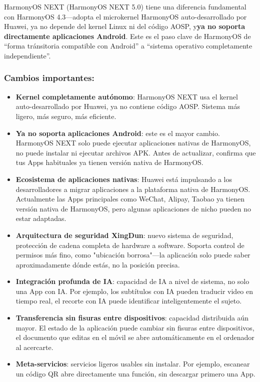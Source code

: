 
HarmonyOS NEXT (HarmonyOS NEXT 5.0) tiene una diferencia fundamental con HarmonyOS 4.3—adopta el microkernel HarmonyOS auto-desarrollado por Huawei, ya no depende del kernel Linux ni del código AOSP, y\textbf{ya no soporta directamente aplicaciones Android}. Este es el paso clave de HarmonyOS de “forma tránsitoria compatible con Android” a “sistema operativo completamente independiente”.

\subsubsection*{Cambios importantes:}

\begin{itemize}
  \item \textbf{Kernel completamente autónomo}: HarmonyOS NEXT usa el kernel auto-desarrollado por Huawei, ya no contiene código AOSP. Sistema más ligero, más seguro, más eficiente.
  \item \textbf{Ya no soporta aplicaciones Android}: este es el mayor cambio. HarmonyOS NEXT solo puede ejecutar aplicaciones nativas de HarmonyOS, no puede instalar ni ejecutar archivos APK. Antes de actualizar, confirma que tus Apps habituales ya tienen versión nativa de HarmonyOS.
  \item \textbf{Ecosistema de aplicaciones nativas}: Huawei está impulsando a los desarrolladores a migrar aplicaciones a la plataforma nativa de HarmonyOS. Actualmente las Apps principales como WeChat, Alipay, Taobao ya tienen versión nativa de HarmonyOS, pero algunas aplicaciones de nicho pueden no estar adaptadas.
  \item \textbf{Arquitectura de seguridad XingDun}: nuevo sistema de seguridad, protección de cadena completa de hardware a software. Soporta control de permisos más fino, como "ubicación borrosa"—la aplicación solo puede saber aproximadamente dónde estás, no la posición precisa.
  \item \textbf{Integración profunda de IA}: capacidad de IA a nivel de sistema, no solo una App con IA. Por ejemplo, los subtítulos con IA pueden traducir video en tiempo real, el recorte con IA puede identificar inteligentemente el sujeto.
  \item \textbf{Transferencia sin fisuras entre dispositivos}: capacidad distribuida aún mayor. El estado de la aplicación puede cambiar sin fisuras entre dispositivos, el documento que editas en el móvil se abre automáticamente en el ordenador al acercarte.
  \item \textbf{Meta-servicios}: servicios ligeros usables sin instalar. Por ejemplo, escanear un código QR abre directamente una función, sin descargar primero una App.
\end{itemize}

